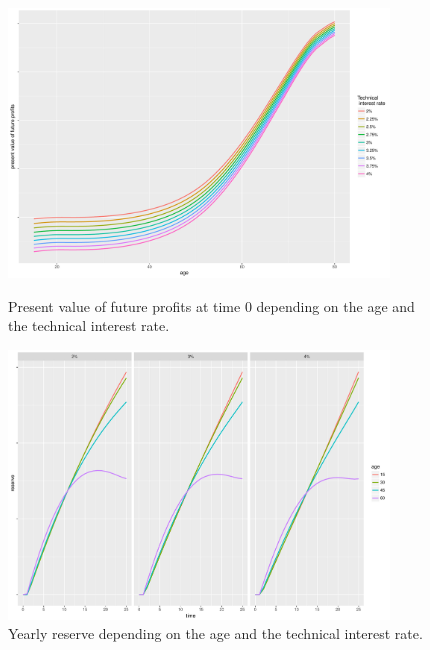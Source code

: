 \begin{figure}
	\centering
	\includegraphics[width=0.9\textwidth]{figures/chapter_sensitivities/sensitivity_age_pvfp}
	\caption{Present value of future profits at time 0 depending on the age and the technical interest rate.}
	\label{fig:sensitivity_age_pvfp}

	\includegraphics[width=0.9\textwidth]{figures/chapter_sensitivities/sensitivity_age_reserve}
	\caption{Yearly reserve depending on the age and the technical interest rate.}
	\label{fig:sensitivity_age_reserve}
\end{figure}


